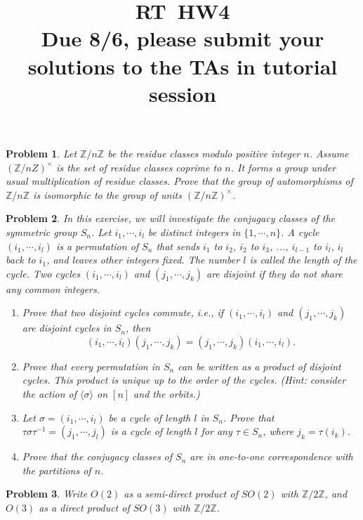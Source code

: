 \documentclass{article}
\title{RT\ HW4 \\ Due 8/6, please submit your solutions to the TAs in tutorial session}
\newtheorem{ex}{Problem}
\newcommand{\Z}{\mathbb{Z}}
\begin{document}
\maketitle      

\begin{ex}
 Let $\Z/n\Z$ be the residue classes modulo positive integer $n$. Assume $(\Z/nZ)^\times $ is the set of residue classes coprime to $n$. It forms a group under usual multiplication of residue classes. Prove that the group of automorphisms of $\Z/n\Z$ is isomorphic to the group of units $(\Z/n\Z)^\times$.
\end{ex}

\begin{ex}
In this exercise, we will investigate the conjugacy classes of the symmetric group $S_n$. Let $i_1, \cdots, i_l$ be distinct integers in $\{1, \cdots, n\}$. A cycle $(i_1, \cdots, i_l)$ is a permutation of $S_n$ that sends $i_1$ to $i_2$, $i_2$ to $i_3$, ..., $i_{l-1}$ to $i_l$, $i_l$ back to $i_1$, and leaves other integers fixed. The number $l$ is called the length of the cycle. Two cycles $(i_1, \cdots, i_l)$ and $(j_1, \cdots, j_k)$ are disjoint if they do not share any common integers. 
\begin{enumerate}
\item Prove that two disjoint cycles commute, i.e., if $(i_1, \cdots, i_l)$ and $(j_1, \cdots, j_k)$ are disjoint cycles in $S_n$, then
\[(i_1, \cdots, i_l)(j_1, \cdots, j_k) = (j_1, \cdots, j_k)(i_1, \cdots, i_l).\]

\item Prove that every permutation in $S_n$ can be written as a product of disjoint cycles. This product is unique up to the order of the cycles. (Hint: consider the action of $\langle \sigma\rangle$ on $[n]$ and the orbits.)

\item Let $\sigma=(i_1, \cdots, i_l)$ be a cycle of length $l$ in $S_n$. Prove that $\tau \sigma \tau^{-1}=(j_1, \cdots, j_l)$ is a cycle of length $l$ for any $\tau\in S_n$, where $j_k=\tau(i_k)$.

\item Prove that the conjugacy classes of $S_n$ are in one-to-one correspondence with the partitions of $n$.
\end{enumerate}

\end{ex}

\begin{ex}
  Write $O(2)$ as a semi-direct product of $SO(2)$ with $\Z/2\Z$,
   and $O(3)$ as a direct product of $SO(3)$ with $\Z/2\Z$.
\end{ex}
\end{document}
